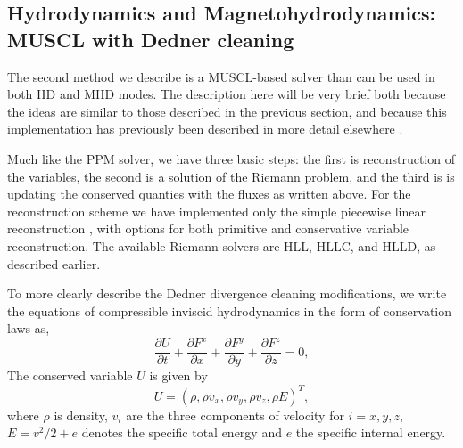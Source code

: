 \subsection{Hydrodynamics and Magnetohydrodynamics: MUSCL with Dedner cleaning}
\label{sec.num.hydro-muscl}

The second method we describe is a MUSCL-based solver than can be used in both HD and MHD modes.  The description here will be very brief both because the ideas are similar to those described in the previous section, and because this implementation has previously
been described in more detail elsewhere \citep{WangAbelZhang08, WangAbel09}.

Much like the PPM solver, we have three basic steps: the first is
reconstruction of the variables, the second is a solution of the
Riemann problem, and the third is is updating the conserved quanties
with the fluxes as written above.
For the reconstruction scheme we have implemented only the simple
piecewise linear reconstruction \citep{1979JCoPh..32..101V, 1985JCoPh..59..264C},
with options for both primitive and conservative variable reconstruction.
The available Riemann solvers are HLL, HLLC, and HLLD, as described earlier.

To more clearly describe the Dedner divergence cleaning modifications, we write the equations of compressible inviscid hydrodynamics in the form of conservation laws as,
\begin{equation}
 \frac{\partial{U}}{\partial{t}} +
 \frac{\partial{F^x}}{\partial{x}} + \frac{\partial{F^y}}{\partial{y}} + \frac{\partial{F^z}}{\partial{z}}= 0, \label{hydro}
\end{equation}
The conserved variable $U$ is given by
\begin{equation}
 U = (\rho, \rho v_x, \rho v_y, \rho v_z, \rho E)^{T},
\end{equation} 
where $\rho$ is density, $v_i$ are the three components of velocity
for $i={x,y,z}$, $E=v^2/2 + e$ denotes the specific total energy and $e$ the
specific internal energy.


